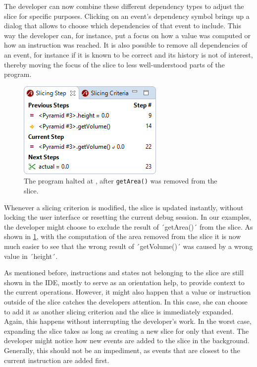 ﻿\documentclass[
      english,
			conference,
      ]{IEEEtran}
\begin{document}
The developer can now combine these different dependency types to adjust the slice for specific purposes.
Clicking on an event's dependency symbol brings up a dialog that allows to choose which dependencies of that event to include.
This way the developer can, for instance, put a focus on how a value was computed or how an instruction was reached.
It is also possible to remove all dependencies of an event, for instance if it is known to be correct and its history is not of interest, thereby moving the focus of the slice to less well-understood parts of the program.

\begin{figure}
	\centering
		\includegraphics[width=0.80\linewidth]{slice2.png}
	\caption{The program halted at , after \lstinline{getArea()} was removed from the slice.}
	\label{fig:slice2}
\end{figure}

Whenever a slicing criterion is modified, the slice is updated instantly, without locking the user interface or resetting the current debug session.
In our examples, the developer might choose to exclude the result of ´getArea()´ from the slice. 
As shown in \cref{fig:slice2}, with the computation of the area removed from the slice it is now much easier to see that the wrong result of ´getVolume()´ was caused by a wrong value in ´height´.


As mentioned before, instructions and states not belonging to the slice are still shown in the IDE, mostly to serve as an orientation help, to provide context to the current operations.
However, it might also happen that a value or instruction outside of the slice catches the developers attention.
In this case, she can choose to add it as another slicing criterion and the slice is immediately expanded.
Again, this happens without interrupting the developer's work.
In the worst case, expanding the slice takes as long as creating a new slice for only that event.
The developer might notice how new events are added to the slice in the background.
Generally, this should not be an impediment, as events that are closest to the current instruction are added first.
\end{document}
